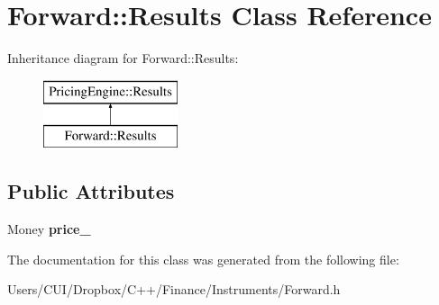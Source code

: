 \hypertarget{class_forward_1_1_results}{}\section{Forward\+:\+:Results Class Reference}
\label{class_forward_1_1_results}
Inheritance diagram for Forward\+:\+:Results\+:\begin{figure}[H]
\begin{center}
\leavevmode
\includegraphics[height=2.000000cm]{class_forward_1_1_results}
\end{center}
\end{figure}
\subsection*{Public Attributes}
\begin{DoxyCompactItemize}
\item 
\hypertarget{class_forward_1_1_results_a61aa9829fa13483ef961836334e1d473}{}\label{class_forward_1_1_results_a61aa9829fa13483ef961836334e1d473} 
Money {\bfseries price\+\_\+}
\end{DoxyCompactItemize}


The documentation for this class was generated from the following file\+:\begin{DoxyCompactItemize}
\item 
Users/\+C\+U\+I/\+Dropbox/\+C++/\+Finance/\+Instruments/Forward.\+h\end{DoxyCompactItemize}
